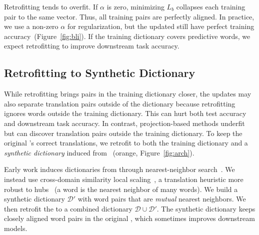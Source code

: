 Retrofitting tends to overfit.
If $\alpha$ is zero, minimizing $L_b$ collapses each training pair
to the same vector.
Thus, all training pairs are perfectly aligned.
In practice, we use a non-zero $\alpha$ for regularization, but the updated
 still have perfect training 
accuracy~(Figure~\ref{fig:bli}).
If the training dictionary covers predictive words, we expect retrofitting to
improve downstream task accuracy.

\subsection{Retrofitting to Synthetic Dictionary}

While retrofitting brings pairs in the training dictionary closer,
the updates may also separate translation pairs outside of the dictionary
because retrofitting ignores words outside the training dictionary.
This can hurt both  test accuracy and downstream task accuracy.
In contrast, projection-based methods underfit but can discover translation
pairs outside the training dictionary.
To keep the original 's correct translations, we
retrofit to both the training dictionary and a \emph{synthetic dictionary}
induced from ~(orange, Figure~\ref{fig:arch}).

Early work induces dictionaries from  through
nearest-neighbor search~\citep{mikolov-13b}.  We instead use
cross-domain similarity local scaling~\citep[]{conneau-18},
a translation heuristic more robust to hubs~\citep{dinu-15} (a word is the
nearest neighbor of many words).
    We build a synthetic dictionary $\mathcal{D'}$ with word pairs that are
\emph{mutual}  nearest neighbors.
We then retrofit the  to a combined dictionary
$\mathcal{D}\cup\mathcal{D}'$.
The synthetic dictionary keeps closely aligned word pairs in the original
, which sometimes improves downstream models.
